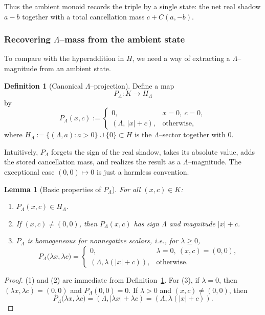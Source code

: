 \documentclass[11pt]{amsart}
\numberwithin{equation}{section}
\newtheorem{lemma}[theorem]{Lemma}
\theoremstyle{definition}
\newtheorem{definition}[theorem]{Definition}
\theoremstyle{remark}
\newcommand{\Hnum}{H}                      %
\newcommand{\Kamb}{K}                      %
\newcommand{\Cfun}{C}                      %
\begin{document}
Thus the ambient monoid records the triple by a single state: the net
real shadow $a-b$ together with a total cancellation mass
$c+\Cfun(a,-b)$.

\subsubsection*{Recovering $\Lambda$--mass from the ambient state}

To compare with the hyperaddition in $\Hnum$, we need a way of
extracting a $\Lambda$--magnitude from an ambient state.

\begin{definition}[Canonical $\Lambda$--projection]\label{def:Lambda-projection-ambient}
Define a map
\[
  P_\Lambda:\Kamb\longrightarrow H_\Lambda
\]
by
\[
  P_\Lambda(x,c)
  :=
  \begin{cases}
    0, & x=0,\ c=0,\\[2pt]
    (\Lambda,\,|x|+c), & \text{otherwise},
  \end{cases}
\]
where $H_\Lambda:=\{(\Lambda,a):a>0\}\cup\{0\}\subset\Hnum$ is the
$\Lambda$--sector together with $0$.
\end{definition}

Intuitively, $P_\Lambda$ forgets the sign of the real shadow, takes its
absolute value, adds the stored cancellation mass, and realizes the
result as a $\Lambda$--magnitude.  The exceptional case $(0,0)\mapsto0$
is just a harmless convention.

\begin{lemma}[Basic properties of $P_\Lambda$]\label{lem:PLambda-basic}
For all $(x,c)\in\Kamb$:
\begin{enumerate}
  \item $P_\Lambda(x,c)\in H_\Lambda$.
  \item If $(x,c)\ne(0,0)$, then $P_\Lambda(x,c)$ has sign $\Lambda$
        and magnitude $|x|+c$.
  \item $P_\Lambda$ is homogeneous for nonnegative scalars, i.e.,
        for $\lambda\ge 0$,
        \[
          P_\Lambda\bigl(\lambda x,\lambda c\bigr)
          =
          \begin{cases}
            0, & \lambda=0,\ (x,c)=(0,0),\\[2pt]
            (\Lambda,\lambda(|x|+c)), & \text{otherwise}.
          \end{cases}
        \]
\end{enumerate}
\end{lemma}

\begin{proof}
(1) and (2) are immediate from Definition~\ref{def:Lambda-projection-ambient}.
For (3), if $\lambda=0$, then $(\lambda x,\lambda c)=(0,0)$ and
$P_\Lambda(0,0)=0$.  If $\lambda>0$ and $(x,c)\ne(0,0)$, then
\[
  P_\Lambda\bigl(\lambda x,\lambda c\bigr)
  = (\Lambda,|\lambda x|+\lambda c)
  = (\Lambda,\lambda(|x|+c)).
\]
\end{proof}
\end{document}
